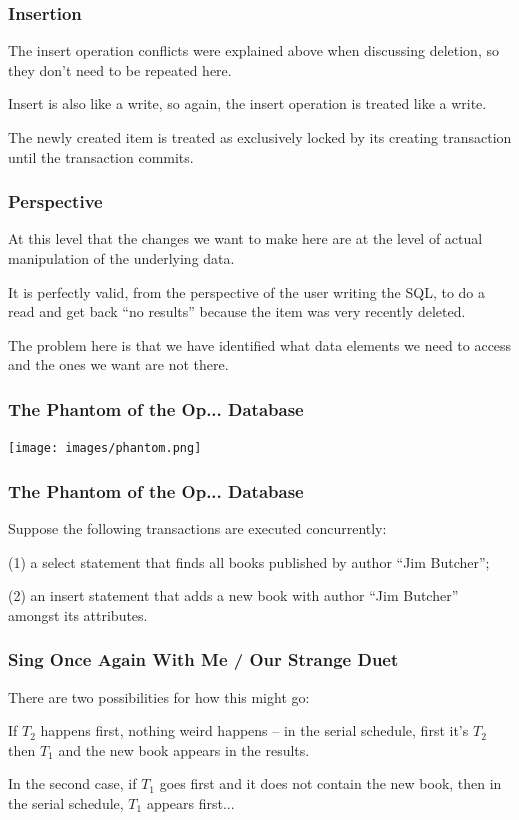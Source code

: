 \begin{frame}
\frametitle{Insertion}

The insert operation conflicts were explained above when discussing deletion, so they don't need to be repeated here. 

Insert is also like a write, so again, the insert operation is treated like a write. 

The newly created item is treated as exclusively locked by its creating transaction until the transaction commits.

\end{frame}

\begin{frame}
\frametitle{Perspective}

At this level that the changes we want to make here are at the level of actual manipulation of the underlying data. 

It is perfectly valid, from the perspective of the user writing the SQL, to do a read and get back ``no results'' because the item was very recently deleted. 

The problem here is that we have identified what data elements we need to access and the ones we want are not there.

\end{frame}

\begin{frame}
\frametitle{The Phantom of the Op... Database}

\begin{center}
\texttt{[image: images/phantom.png]}
\end{center}


\end{frame}

\begin{frame}
\frametitle{The Phantom of the Op... Database}

Suppose the following transactions are executed concurrently: 

(1) a select statement that finds all books published by author ``Jim Butcher''; 

(2) an insert statement that adds a new book with author ``Jim Butcher'' amongst its attributes. 

\end{frame}

\begin{frame}
\frametitle{Sing Once Again With Me / Our Strange Duet}

There are two possibilities for how this might go: 


If $T_{2}$ happens first, nothing weird happens -- in the serial schedule, first it's $T_{2}$ then $T_{1}$ and the new book appears in the results. 

In the second case, if $T_{1}$ goes first and it does not contain the new book, then in the serial schedule, $T_{1}$ appears first... 

\end{frame}

